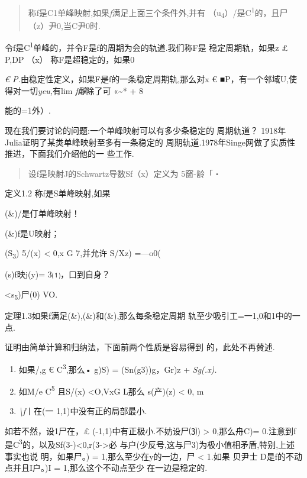 \documentclass{article}
\begin{document}
\begin{quote}
称f是C1单峰映射,如果\emph{f}满足上面三个条件外,并有
（u\textsubscript{4}）/是C\textsuperscript{1}的，且尸（z）尹0,当C尹0时.
\end{quote}

令f是C\textsuperscript{1}单峰的，并令F是f的周期为会的轨道.我们称F是
稳定周期轨，如果z £ P,\textbar{}DP （x） \textbar{} 称F是超稳定的，如果0

\emph{€ P.}由稳定性定义，如果F是f的一条稳定周期轨,那么对x €
■P，有一个邻域U,使得对一切\emph{yeu,}有lim \emph{f醇}除了可
«\textasciitilde{}* + 8

能的=1外）.

现在我们要讨论的问题:一个单峰映射可以有多少条稳定的 周期轨道？
1918年Julia证明了某类单峰映射至多有一条稳定的
周期轨道.1978年Singe网做了实质性推进，下面我们介绍他的一 些工作.

\begin{quote}
设f是映射J的Schwartz导数Sf（x）定义为 5窗-龄「・
\end{quote}

定义1.2 称f是S单峰映射,如果

(\&)/是仃单峰映射！

(\&)f是U映射；

(S\textsubscript{3}) 5/(x) \textless{} 0,x G 7,并允许 S/Xz) =---o0(

(s)f映j(y)= 3⑴，口到自身？

\textless{}s\textsubscript{5})尸(0) VO.

定理1.3如果f满足(\&),(\&)和(\&),那么每条稳定周期
轨至少吸引工=一1,0和1中的一点.

证明由简单计算和归纳法，下面前两个性质是容易得到 的，此处不再賛述.

\begin{enumerate}
\def\labelenumi{\arabic{enumi}.}
\item
  如果/,g € C\textsuperscript{3},那么• g)S) = (Sn(g3))g，Gr)z +
  \emph{Sg(.x).}
\item
  如M/e C\textsuperscript{5} 且S/(x) \textless{}O,VxG L那么 s(产)(z)
  \textless{} 0, m
\item
  \emph{\textbackslash{}f}丨在(一 1,1)中没有正的局部最小.
\end{enumerate}

如若不然，设1尸\textbar{}在，£ (-1,1)中有正极小.不妨设尸⑶)
\textgreater{} 0,那么舟C)=
0.注意到f是C\textsuperscript{3}的，以及Sf(3-)\textless{}0,r(3-\textgreater{}必
与户(少反号,这与尸3)为极小值相矛盾,特别,上述事实也说
明，如果\textbar{}尸。)\textbar{} =
1,那么至少在y的一边，\textbar{}尸\textbar{} \textless{} 1.如果 贝尹士
D是f的不动点并且I户。)I = 1,那么这个不动点至少 在一边是稳定的.
\end{document}

